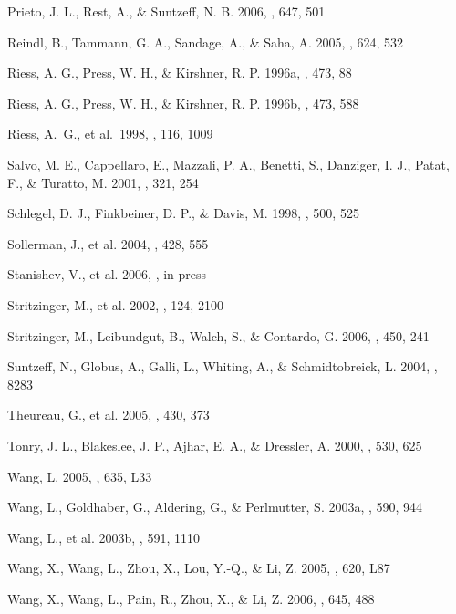 \documentclass[12pt,preprint,psfig,epsf]{aastex}
\begin{document}
\begin{thebibliography}{}
 Prieto, J. L., Rest, A., \&
Suntzeff, N. B. 2006, \apj, 647, 501

 Reindl, B., Tammann, G. A.,
Sandage, A., \& Saha, A. 2005, \apj, 624, 532

 Riess, A. G.,
Press, W. H., \& Kirshner, R. P. 1996a, \apj, 473, 88

Riess, A. G., Press, W. H., \& Kirshner, R. P. 1996b, \apj, 473, 588

 Riess, A.\ G., et al.\ 1998,
\aj, 116, 1009

 Salvo, M. E., Cappellaro, E., 
Mazzali, P. A., Benetti, S., Danziger, I. J., Patat, F., \& Turatto, M. 2001,
\mnras, 321, 254

 Schlegel,
D. J., Finkbeiner, D. P., \& Davis, M. 1998, \apj, 500, 525

 Sollerman, J., et al. 2004,
\aap, 428, 555

 Stanishev, V., et al. 2006,
\aap, in press

 Stritzinger, M., et al. 
2002, \aj, 124, 2100

 Stritzinger, M., Leibundgut,
B., Walch, S., \& Contardo, G. 2006, \aap, 450, 241

 Suntzeff, N., Globus, A., Galli, L.,
Whiting, A., \& Schmidtobreick, L. 2004, \iaucirc, 8283

 Theureau, G., et al. 2005,
\aap, 430, 373

 Tonry, J. L., Blakeslee, J. P.,
Ajhar, E. A., \& Dressler, A. 2000, \apj, 530, 625

%
 Wang, L. 2005, \apjl, 635, L33

%
 Wang, L., Goldhaber, G.,
Aldering, G., \& Perlmutter, S. 2003a, \apj, 590, 944

%
 Wang, L., et al. 2003b, \apj, 591, 
1110

%
 Wang, X., Wang, L., Zhou, 
X., Lou, Y.-Q., \& Li, Z. 2005, \apjl, 620, L87

 Wang, X., Wang, L., Pain, R.,
Zhou, X., \& Li, Z. 2006, \apj, 645, 488


\end{thebibliography}
\end{document}

